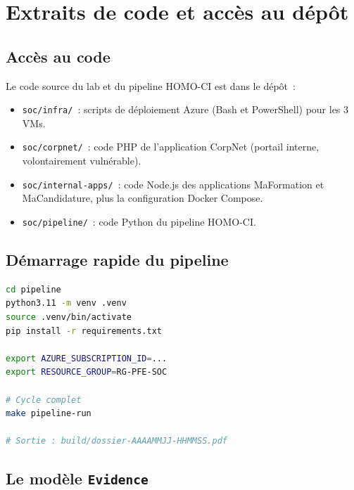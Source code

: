 \chapter{Extraits de code et accès au dépôt}
\label{annexe:code}

\section{Accès au code}

Le code source du lab et du pipeline HOMO-CI est dans le dépôt~:

\begin{itemize}
  \item \texttt{soc/infra/}~: scripts de déploiement Azure (Bash et
    PowerShell) pour les 3 VMs.
  \item \texttt{soc/corpnet/}~: code PHP de l'application
    CorpNet (portail interne, volontairement vulnérable).
  \item \texttt{soc/internal-apps/}~: code Node.js des
    applications MaFormation et MaCandidature, plus la
    configuration Docker Compose.
  \item \texttt{soc/pipeline/}~: code Python du pipeline
    HOMO-CI.
\end{itemize}

\section{Démarrage rapide du pipeline}

\begin{lstlisting}[language=bash,caption={Installation et premier
cycle.}]
cd pipeline
python3.11 -m venv .venv
source .venv/bin/activate
pip install -r requirements.txt

export AZURE_SUBSCRIPTION_ID=...
export RESOURCE_GROUP=RG-PFE-SOC

# Cycle complet
make pipeline-run

# Sortie : build/dossier-AAAAMMJJ-HHMMSS.pdf
\end{lstlisting}

\section{Le modèle \texttt{Evidence}}

